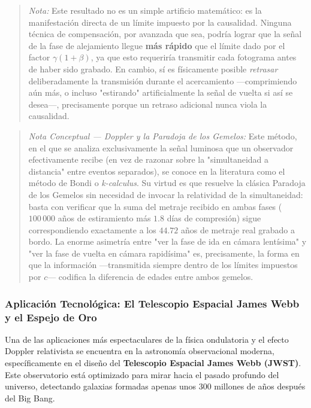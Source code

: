 \documentclass[11pt,a4paper]{book}
\begin{document}
\begin{quote}
\textit{Nota:} Este resultado no es un simple artificio matemático: es la manifestación directa
de un límite impuesto por la causalidad. Ninguna técnica de compensación, por avanzada que sea,
podría lograr que la señal de la fase de alejamiento llegue \textbf{más rápido} que el límite
dado por el factor $\gamma(1+\beta)$, ya que esto requeriría transmitir cada fotograma antes de
haber sido grabado. En cambio, sí es físicamente posible \textit{retrasar} deliberadamente la
transmisión durante el acercamiento —comprimiendo aún más, o incluso "estirando" artificialmente
la señal de vuelta si así se desea—, precisamente porque un retraso adicional nunca viola la
causalidad.
\end{quote}

\begin{quote}
\textit{Nota Conceptual — Doppler y la Paradoja de los Gemelos:} Este método, en el que se
analiza exclusivamente la señal luminosa que un observador efectivamente recibe (en vez de
razonar sobre la "simultaneidad a distancia" entre eventos separados), se conoce en la literatura
como el método de Bondi o \textit{k-calculus}. Su virtud es que resuelve la clásica Paradoja de
los Gemelos sin necesidad de invocar la relatividad de la simultaneidad: basta con verificar que
la suma del metraje recibido en ambas fases ($100\,000$ años de estiramiento más $1.8$ días de
compresión) sigue correspondiendo exactamente a los $44.72$ años de metraje real grabado a bordo.
La enorme asimetría entre "ver la fase de ida en cámara lentísima" y "ver la fase de vuelta en
cámara rapidísima" es, precisamente, la forma en que la información —transmitida siempre dentro
de los límites impuestos por $c$— codifica la diferencia de edades entre ambos gemelos.
\end{quote}

\subsubsection{Aplicación Tecnológica: El Telescopio Espacial James Webb y el Espejo de Oro}

Una de las aplicaciones más espectaculares de la física ondulatoria y el efecto Doppler relativista se encuentra en la astronomía observacional moderna, específicamente en el diseño del \textbf{Telescopio Espacial James Webb (JWST)}. Este observatorio está optimizado para mirar hacia el pasado profundo del universo, detectando galaxias formadas apenas unos $300$ millones de años después del Big Bang.
\end{document}
